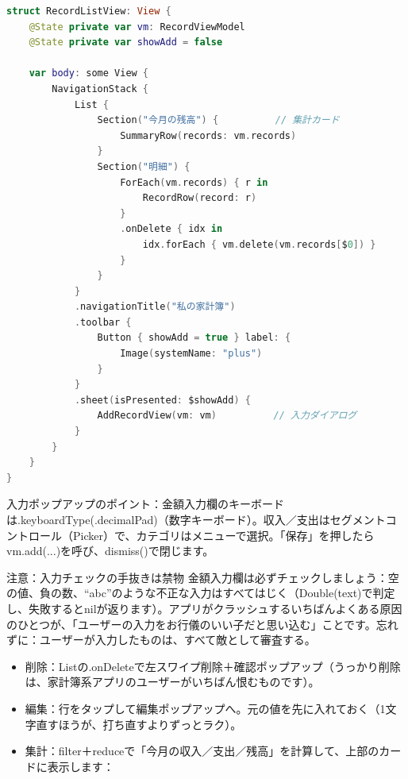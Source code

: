 
\begin{lstlisting}[language=Swift]
struct RecordListView: View {
    @State private var vm: RecordViewModel
    @State private var showAdd = false

    var body: some View {
        NavigationStack {
            List {
                Section("今月の残高") {          // 集計カード
                    SummaryRow(records: vm.records)
                }
                Section("明細") {
                    ForEach(vm.records) { r in
                        RecordRow(record: r)
                    }
                    .onDelete { idx in
                        idx.forEach { vm.delete(vm.records[$0]) }
                    }
                }
            }
            .navigationTitle("私の家計簿")
            .toolbar {
                Button { showAdd = true } label: {
                    Image(systemName: "plus")
                }
            }
            .sheet(isPresented: $showAdd) {
                AddRecordView(vm: vm)          // 入力ダイアログ
            }
        }
    }
}
\end{lstlisting}

入力ポップアップのポイント：金額入力欄のキーボードは.keyboardType(.decimalPad)（数字キーボード）。収入／支出はセグメントコントロール（Picker）で、カテゴリはメニューで選択。「保存」を押したらvm.add(...)を呼び、dismiss()で閉じます。

\begin{tcbwarn}{注意：入力チェックの手抜きは禁物}
金額入力欄は必ずチェックしましょう：空の値、負の数、“abc”のような不正な入力はすべてはじく（Double(text)で判定し、失敗するとnilが返ります）。アプリがクラッシュするいちばんよくある原因のひとつが、「ユーザーの入力をお行儀のいい子だと思い込む」ことです。忘れずに：ユーザーが入力したものは、すべて敵として審査する。

\end{tcbwarn}


\begin{itemize}
  \item 削除：Listの.onDeleteで左スワイプ削除＋確認ポップアップ（うっかり削除は、家計簿系アプリのユーザーがいちばん恨むものです）。
  \item 編集：行をタップして編集ポップアップへ。元の値を先に入れておく（1文字直すほうが、打ち直すよりずっとラク）。
  \item 集計：filter＋reduceで「今月の収入／支出／残高」を計算して、上部のカードに表示します：
\end{itemize}

